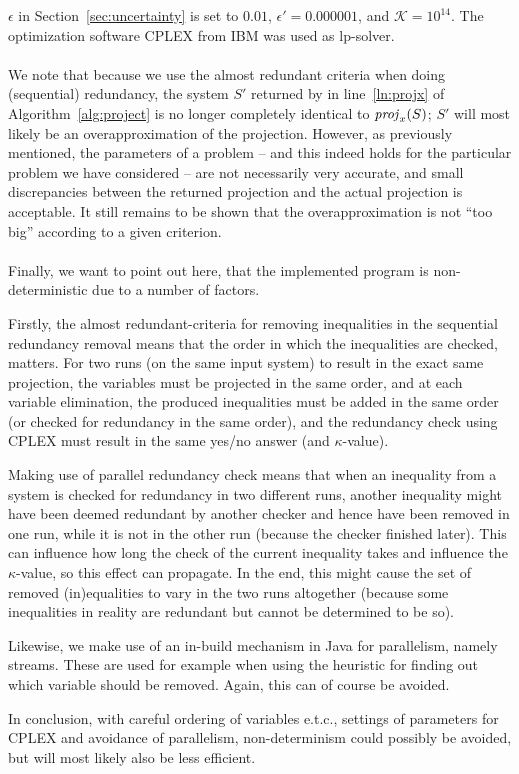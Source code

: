 $\epsilon$ in Section~\ref{sec:uncertainty} is set to $0.01$, $\epsilon' = 0.000001$, and $\mathcal{K} = 10^{14}$. The optimization software CPLEX from IBM was used as lp-solver. 
\\
\\
{We note that because we use the almost redundant criteria when doing (sequential) redundancy, the system $S'$ returned by  in line~\ref{ln:projx} of Algorithm~\ref{alg:project} is no longer completely identical to $\mathit{proj}_x(S)$; $S'$ will most likely be an overapproximation of the projection. However, as previously mentioned, the parameters of a problem -- and this indeed holds for the particular problem we have considered -- are not necessarily very accurate, and small discrepancies between the returned projection and the actual projection is acceptable. It still remains to be shown that the overapproximation is not ``too big'' according to a given criterion.}
\\
\\
Finally, we want to point out here, that the implemented program is non-deterministic due to a number of factors. 

Firstly, the almost redundant-criteria for removing inequalities in the sequential redundancy removal means that the order in which the inequalities are checked, matters. 
For two runs (on the same input system) to result in the exact  same projection, the variables must be projected in the same order, and at each variable elimination, the produced inequalities must be added in the same order (or checked for redundancy in the same order), and the redundancy check using CPLEX must result in the same yes/no answer (and $\kappa$-value). 
 
Making use of parallel redundancy check means that when an inequality from a system is checked for redundancy in two different runs, another inequality might have been deemed redundant by another checker and hence have been removed in one run, while it is not in the other run (because the checker finished later). This can influence how long the check of the current inequality takes and influence the $\kappa$-value, so this effect can propagate. In the end, this might cause the set of removed (in)equalities to vary in the two runs altogether (because some inequalities in reality are redundant but cannot be determined to be so). 

Likewise, we make use of an in-build mechanism in Java for parallelism, namely streams. These are used for example when using the heuristic for finding out which variable should be removed. Again, this can of course be avoided.

In conclusion, with careful ordering of variables e.t.c., settings of parameters for CPLEX and avoidance of parallelism, non-determinism could possibly be avoided, but will most likely also be less efficient.  
